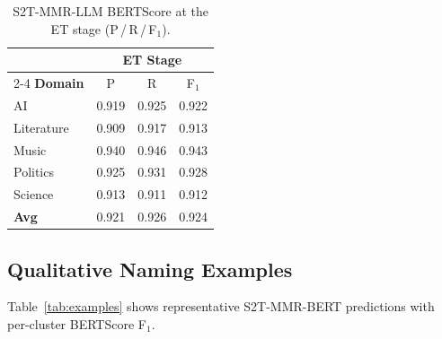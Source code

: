 \documentclass[11pt,a4paper]{article}
\begin{document}
\begin{table}[h]
\centering
\caption{S2T-MMR-LLM BERTScore at the ET stage (P\,/\,R\,/\,F$_1$).}
\label{tab:mmr_llm_detail}
\setlength{\tabcolsep}{6pt}
\small
\begin{tabular}{l ccc}
\toprule
& \multicolumn{3}{c}{\cellcolor{s2tollcol}\textbf{ET Stage}} \\
\cmidrule(lr){2-4}
\textbf{Domain} & P & R & F$_1$ \\
\midrule
AI         & 0.919 & 0.925 & 0.922 \\
Literature & 0.909 & 0.917 & 0.913 \\
Music      & 0.940 & 0.946 & 0.943 \\
Politics   & 0.925 & 0.931 & 0.928 \\
Science    & 0.913 & 0.911 & 0.912 \\
\midrule
\textbf{Avg} & 0.921 & 0.926 & 0.924 \\
\bottomrule
\end{tabular}
\end{table}

\subsection{Qualitative Naming Examples}

Table~\ref{tab:examples} shows representative S2T-MMR-BERT predictions
with per-cluster BERTScore F$_1$.
\end{document}
